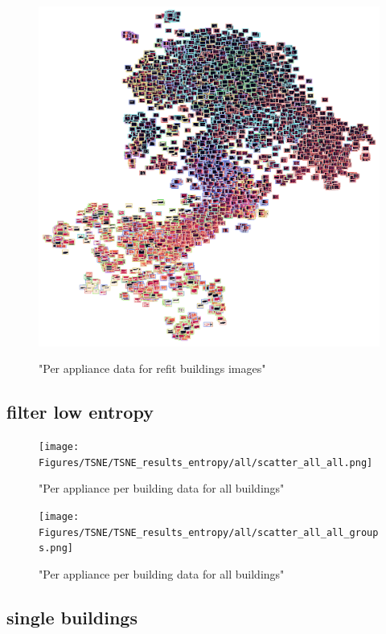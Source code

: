 \begin{figure}[H]
	\centering
	\caption{"Per appliance data for refit buildings images"}
	\includegraphics[width=.9\textwidth]{Figures/TSNE/TSNE_results/all/img_scatter_all_all_groups.png}
	\label{fig:tsne_papb_img_scatter_all_groups}
\end{figure}


\subsection{filter low entropy}

\begin{figure}[H]
	\centering
	\caption{"Per appliance per building data for all buildings"}
	\texttt{[image: Figures/TSNE/TSNE\_results\_entropy/all/scatter\_all\_all.png]}
	\label{fig:tsne_papb_scatter_ent_all_groups}
\end{figure}

\begin{figure}[H]
	\centering
	\caption{"Per appliance per building data for all buildings"}
	\texttt{[image: Figures/TSNE/TSNE\_results\_entropy/all/scatter\_all\_all\_groups.png]}
	\label{fig:tsne_papb_img_scatter_ent_all_groups}
\end{figure}


\subsection{single buildings}

